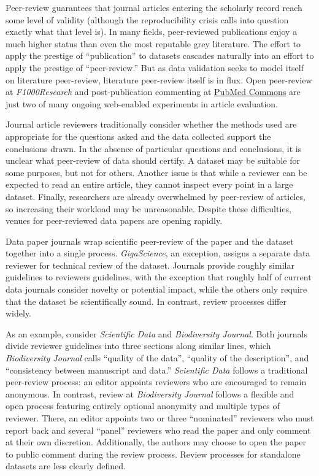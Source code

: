 \documentclass[10pt,twocolumn]{article}
\begin{document}
Peer-review guarantees that journal articles entering the scholarly record reach some level of validity (although the reproducibility crisis calls into question exactly what that level is).
In many fields, peer-reviewed publications enjoy a much higher status than even the most reputable grey literature.
The effort to apply the prestige of ``publication'' to datasets cascades naturally into an effort to apply the prestige of ``peer-review.''
But as data validation seeks to model itself on literature peer-review, literature peer-review itself is in flux\cite{pulverer_transparent_2010, herron_is_2012, kriegeskorte_emerging_2012}.
Open peer-review at \emph{F1000Research} and post-publication commenting at \href{http://www.ncbi.nlm.nih.gov/pubmedcommons/}{PubMed Commons} are just two of many ongoing web-enabled experiments in article evaluation.

Journal article reviewers traditionally consider whether the methods used are appropriate for the questions asked and the data collected support the conclusions drawn.
In the absence of particular questions and conclusions, it is unclear what peer-review of data should certify.
A dataset may be suitable for some purposes, but not for others.\cite{parsons_data_2010}
Another issue is that while a reviewer can be expected to read an entire article, they cannot inspect every point in a large dataset.
Finally, researchers are already overwhelmed by peer-review of articles\cite{diederich_are_2013}, so increasing their workload may be unreasonable.
Despite these difficulties, venues for peer-reviewed data papers are opening rapidly.

Data paper journals wrap scientific peer-review of the paper and the dataset together into a single process. %
\emph{GigaScience}, an exception, assigns a separate data reviewer for technical review of the dataset.
Journals provide roughly similar guidelines to reviewers guidelines, with the exception that roughly half of current data journals consider novelty or potential impact, while the others only require that the dataset be scientifically sound.
In contrast, review processes differ widely.

As an example, consider \emph{Scientific Data} and \emph{Biodiversity Journal}.
Both journals divide reviewer guidelines into three sections along similar lines, which \emph{Biodiversity Journal} calls ``quality of the data'', ``quality of the description'', and ``consistency between manuscript and data.''
\emph{Scientific Data} follows a traditional peer-review process: an editor appoints reviewers who are encouraged to remain anonymous.
In contrast, review at \emph{Biodiversity Journal} follows a flexible and open process featuring entirely optional anonymity and multiple types of reviewer.
There, an editor appoints two or three ``nominated'' reviewers who must report back and several ``panel'' reviewers who read the paper and only comment at their own discretion.
Additionally, the authors may choose to open the paper to public comment during the review process.
Review processes for standalone datasets are less clearly defined.
\end{document}
